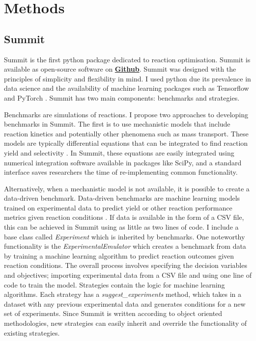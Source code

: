 \section{Methods}

\subsection{Summit}
Summit is the first python package dedicated to reaction optimisation. Summit is available as open-source software on \textbf{\href{https://github.com/sustainable-processes/summit}{Github}}.  Summit was designed with the principles of simplicity and  flexibility in mind. I used python due its prevalence in data science and the availability of machine learning packages such as Tensorflow \cite{tensorflow2015} and PyTorch \cite{Paszke2019}. Summit has two main components: benchmarks and strategies.
    
Benchmarks are simulations of reactions. I propose two approaches to developing benchmarks in Summit. The first is to use mechanistic models that include reaction kinetics and potentially other phenomena such as mass transport. These models are typically differential equations that can be integrated to find reaction yield and selectivity \cite{Reizman2015b, Baumgartner2018}. In Summit, these equations are easily integrated using numerical integration software available in packages like SciPy, \cite{2020SciPy-NMeth} and a standard interface saves researchers the time of re-implementing common functionality. 

Alternatively, when a mechanistic model is not available, it is possible to create a data-driven benchmark. Data-driven benchmarks are machine learning models trained on experimental data to predict yield or other reaction performance metrics given reaction conditions \cite{Hase2020a}.  If data is available in the form of a CSV file, this can be achieved in Summit using as little as two lines of code. I include a base class called \textit{Experiment} which is inherited by benchmarks. One noteworthy functionality is the \textit{ExperimentalEmulator} which creates a benchmark from data by training a machine learning algorithm to predict reaction outcomes given reaction conditions. The overall process involves specifying the decision variables and objectives; importing experimental data from a CSV file and using one line of code to train the model. Strategies contain the logic for machine learning algorithms. Each strategy has a \textit{suggest\_experiments} method, which takes in a dataset with any previous experimental data and generates conditions for a new set of experiments.  Since Summit is written according to object oriented methodologies, new strategies can easily inherit and override the functionality of existing strategies.

